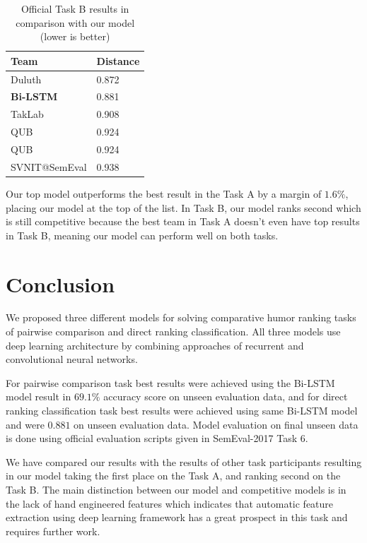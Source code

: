 \documentclass[10pt, a4paper]{article}
\begin{document}
\begin{table}
    \caption{Official Task B results in comparison with our model (lower is
    better)}
 \label{tab:task_b_official}
 \begin{center}
 \begin{tabular}{ll}
 \toprule
     Team & Distance\\
 \midrule
     Duluth & 0.872 \\
     \textbf{Bi-LSTM} & 0.881 \\
     TakLab & 0.908\\
     QUB & 0.924\\
     QUB & 0.924\\
     SVNIT@SemEval & 0.938\\
 \bottomrule
 \end{tabular}
 \end{center}
\end{table}

Our top model outperforms the best result in the Task A by a margin of
$1.6\%$, placing our model at the top of the list. In Task B, our model ranks
second which is still competitive because the best team in Task A doesn't even
have top results in Task B, meaning our model can perform well on both tasks.


\section{Conclusion}
We proposed three different models for solving comparative humor ranking tasks
of pairwise comparison and direct ranking classification. All three
models use deep learning architecture by combining approaches of recurrent and
convolutional neural networks.

For pairwise comparison task best results were achieved using the Bi-LSTM model
result in $69.1\%$ accuracy score on unseen evaluation data, and for
direct ranking classification task best results were achieved using same
Bi-LSTM model and were $0.881$ on unseen evaluation data. Model
evaluation on final unseen data is done using official evaluation scripts given
in SemEval-2017 Task 6.

We have compared our results with the results of other task participants resulting
in our model taking the first place on the Task A, and ranking second on the Task B.
The main distinction between our model and competitive models is in the lack of
hand engineered features which indicates that automatic feature extraction using
deep learning framework has a great prospect in this task and requires further work.
\end{document}
